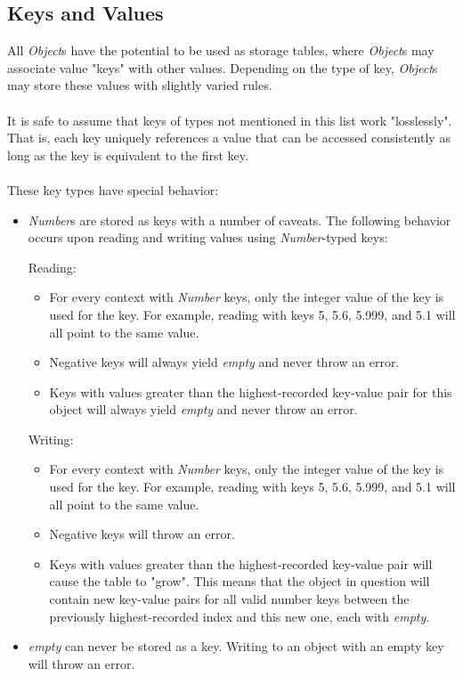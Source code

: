 \documentclass[12pt,letterpaper]{report}
\begin{document}
\subsection{Keys and Values}\label{Keys and Values}

All \textit{Object}s have the potential to be used as storage tables, where \textit{Object}s may associate 
value "keys" with other values. Depending on the type of key, \textit{Object}s may store these values 
with slightly varied rules. 
\\\\
It is safe to assume that keys of types not mentioned in this list work "losslessly". That is, 
each key uniquely references a value that can be accessed consistently as long as the 
key is equivalent to the first key.
\\\\
These key types have special behavior:


\begin{itemize}
  \item \textit{Number}s are stored as keys with a number of caveats. The following behavior occurs 
  upon reading and writing values using \textit{Number}-typed keys:
  
  Reading:
  \begin{itemize}
    \item For every context with \textit{Number} keys, only the integer value of the key is used for the key. For example, reading with keys 5, 5.6, 5.999, and 5.1 will all point to the same value.    
    \item Negative keys will always yield \textit{empty} and never throw an error.
    \item Keys with values greater than the highest-recorded key-value pair for this object will always yield \textit{empty} and never throw an error.      
  \end{itemize}

  Writing:
  \begin{itemize}
    \item For every context with \textit{Number} keys, only the integer value of the key is used for the key. For example, reading with keys 5, 5.6, 5.999, and 5.1 will all point to the same value.    
    \item Negative keys will throw an error.
    \item Keys with values greater than the highest-recorded key-value pair will cause the table to "grow". This means that the object in question will contain new key-value pairs for all valid number keys between the previously highest-recorded index and this new one, each with \textit{empty}.
  \end{itemize}

  \item \textit{empty} can never be stored as a key. Writing to an object with an empty key will throw an error.
\end{itemize}
\end{document}
